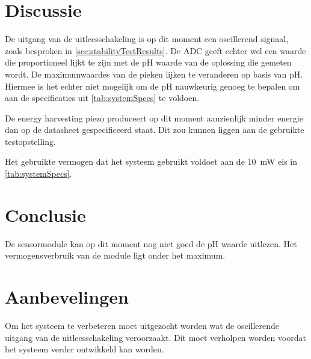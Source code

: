 \section{Discussie}
De uitgang van de uitleesschakeling is op dit moment een oscillerend signaal, zoals besproken in \cref{sec:stabilityTestResults}. De ADC geeft echter wel een waarde die proportioneel lijkt te zijn met de pH waarde van de oplossing die gemeten wordt.
De maximumwaardes van de pieken lijken te veranderen op basis van pH. Hiermee is het echter niet mogelijk om de pH nauwkeurig genoeg te bepalen om aan de specificaties uit \cref{tab:systemSpecs} te voldoen.

De energy harvesting piezo produceert op dit moment aanzienlijk minder energie dan op de datasheet gespecificeerd staat. Dit zou kunnen liggen aan de gebruikte testopstelling.

Het gebruikte vermogen dat het systeem gebruikt voldoet aan de \qty{10}{\milli\watt} eis in \cref{tab:systemSpecs}.

\newpage
\section{Conclusie}
De sensormodule kan op dit moment nog niet goed de pH waarde uitlezen. Het vermogensverbruik van de module ligt onder het maximum.


\newpage
\section{Aanbevelingen}
Om het systeem te verbeteren moet uitgezocht worden wat de oscillerende uitgang van de uitleesschakeling veroorzaakt. Dit moet verholpen worden voordat het systeem verder ontwikkeld kan worden. 


